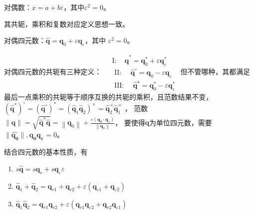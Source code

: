 \documentclass[lang=cn,newtx,10pt,scheme=chinese]{elegantbook}
\begin{document}
\begin{definition}
  对偶数：$x = a + b\varepsilon$，其中$\varepsilon^2=0$。
\end{definition}
其共轭，乘积和复数对应定义思想一致。
\begin{definition}
  对偶四元数：$\widehat{\boldsymbol{q}}=\boldsymbol{q}_0+\varepsilon \boldsymbol{q}_{\varepsilon}$，其中
  $\varepsilon ^2 =0$。
\end{definition}
对偶四元数的共轭有三种定义：
$\begin{aligned} 
  & \mathrm{I}: \quad \widehat{\boldsymbol{q}}^*=\boldsymbol{q}_0^*+\varepsilon \boldsymbol{q}_{\varepsilon}^* \\ 
  & \text { II: } \quad \widehat{\boldsymbol{q}}^{\circ}=\boldsymbol{q}_0-\varepsilon \boldsymbol{q}_{\varepsilon} \\ 
  & \text { III: } \quad \widehat{\boldsymbol{q}}^{\star}=\boldsymbol{q}_0^*-\varepsilon \boldsymbol{q}_{\varepsilon}^* 
\end{aligned}$
但不管哪种，其都满足最后一点乘积的共轭等于顺序互换的共轭的乘积，且范数结果不变，
$\left(\widehat{\boldsymbol{q}}^*\right)^{\circ}=\left(\widehat{\boldsymbol{q}}^{\circ}\right)^* 
=\left(\widehat{\boldsymbol{q}}_1 \widehat{\boldsymbol{q}}_2\right)^{\times}=\widehat{\boldsymbol{q}}_2^{\times} \widehat{\boldsymbol{q}}_1^{\times} 
$ ，
范数$\|\widehat{\boldsymbol{q}}\|=\sqrt{\widehat{\boldsymbol{q}}^* \widehat{\boldsymbol{q}}}=\left\|\boldsymbol{q}_0\right\|+\frac{\varepsilon\left(\boldsymbol{q}_0 \cdot \boldsymbol{q}_{\varepsilon}\right)}{\left\|\boldsymbol{q}_0\right\|}$，
要使得$\widehat{\boldsymbol{q}}$为单位四元数，需要$\|\widehat{\boldsymbol{q_0}}\|,\boldsymbol{q_0} \boldsymbol{q_{\varepsilon}}=0$。

结合四元数的基本性质，有
\begin{proposition}
  \begin{enumerate}
    \item $s \widehat{\boldsymbol{q}}=s \boldsymbol{q}_r+s \boldsymbol{q}_{\varepsilon} \varepsilon$
    \item $\widehat{\boldsymbol{q}}_1+\widehat{\boldsymbol{q}}_2=\boldsymbol{q}_{r 1}+\boldsymbol{q}_{r 2}+\varepsilon\left(\boldsymbol{q}_{\varepsilon 1}+\boldsymbol{q}_{\varepsilon 2}\right)$
    \item $\widehat{\boldsymbol{q}}_1 \widehat{\boldsymbol{q}}_2=\boldsymbol{q}_{r 1} \boldsymbol{q}_{r 2}+\varepsilon\left(\boldsymbol{q}_{r 1} \boldsymbol{q}_{\varepsilon 2}+\boldsymbol{q}_{r 2} \boldsymbol{q}_{\varepsilon 1}\right)$
  \end{enumerate}
\end{proposition}
\end{document}
